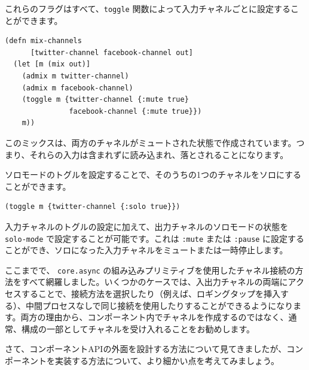 これらのフラグはすべて、\texttt{toggle} 関数によって入力チャネルごとに設定することができます。

\begin{lstlisting}[numbers=none]
(defn mix-channels
      [twitter-channel facebook-channel out]
  (let [m (mix out)]
    (admix m twitter-channel)
    (admix m facebook-channel)
    (toggle m {twitter-channel {:mute true}
               facebook-channel {:mute true}})
    m))
\end{lstlisting}

このミックスは、両方のチャネルがミュートされた状態で作成されています。つまり、それらの入力は含まれずに読み込まれ、落とされることになります。

ソロモードのトグルを設定することで、そのうちの1つのチャネルをソロにすることができます。

\begin{lstlisting}[numbers=none]
(toggle m {twitter-channel {:solo true}})
\end{lstlisting}

入力チャネルのトグルの設定に加えて、出力チャネルのソロモードの状態を \texttt{solo-mode} で設定することが可能です。これは \texttt{:mute} または \texttt{:pause} に設定することができ、ソロになった入力チャネルをミュートまたは一時停止します。

ここまでで、 \texttt{core.async} の組み込みプリミティブを使用したチャネル接続の方法をすべて網羅しました。いくつかのケースでは、入出力チャネルの両端にアクセスすることで、接続方法を選択したり（例えば、ロギングタップを挿入する）、中間プロセスなしで同じ接続を使用したりすることができるようになります。両方の理由から、コンポーネント内でチャネルを作成するのではなく、通常、構成の一部としてチャネルを受け入れることをお勧めします。

さて、コンポーネントAPIの外面を設計する方法について見てきましたが、コンポーネントを実装する方法について、より細かい点を考えてみましょう。



